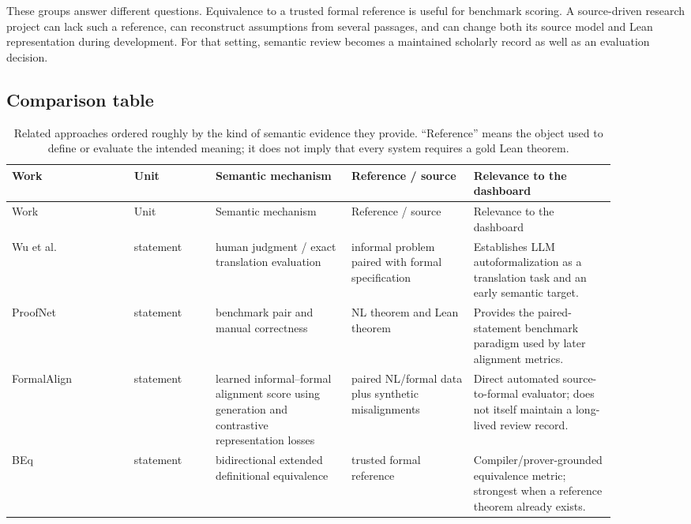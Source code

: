 \documentclass[11pt]{article}
\begin{document}
These groups answer different questions.  Equivalence to a trusted formal
reference is useful for benchmark scoring.  A source-driven research project can
lack such a reference, can reconstruct assumptions from several passages, and
can change both its source model and Lean representation during development.
For that setting, semantic review becomes a maintained scholarly record as well
as an evaluation decision.

\begin{landscape}
\section{Comparison table}
\small
\begin{longtable}{@{}p{0.18\linewidth}p{0.12\linewidth}p{0.20\linewidth}p{0.18\linewidth}p{0.21\linewidth}@{}}
\caption{Related approaches ordered roughly by the kind of semantic evidence they provide.  ``Reference'' means the object used to define or evaluate the intended meaning; it does not imply that every system requires a gold Lean theorem.}\label{tab:rw-matrix}\\
\toprule
Work & Unit & Semantic mechanism & Reference / source & Relevance to the dashboard \\
\midrule
\endfirsthead
\toprule
Work & Unit & Semantic mechanism & Reference / source & Relevance to the dashboard \\
\midrule
\endhead
\bottomrule
\endfoot

Wu et al. \citep{wu2022autoformalization} & statement & human judgment / exact translation evaluation & informal problem paired with formal specification & Establishes LLM autoformalization as a translation task and an early semantic target. \\

ProofNet \citep{azerbayev2023proofnet} & statement & benchmark pair and manual correctness & NL theorem and Lean theorem & Provides the paired-statement benchmark paradigm used by later alignment metrics. \\

FormalAlign \citep{lu2025formalalign} & statement & learned informal--formal alignment score using generation and contrastive representation losses & paired NL/formal data plus synthetic misalignments & Direct automated source-to-formal evaluator; does not itself maintain a long-lived review record. \\

BEq \citep{liu2025beq} & statement & bidirectional extended definitional equivalence & trusted formal reference & Compiler/prover-grounded equivalence metric; strongest when a reference theorem already exists. \\


\end{longtable}
\end{landscape}
\end{document}
